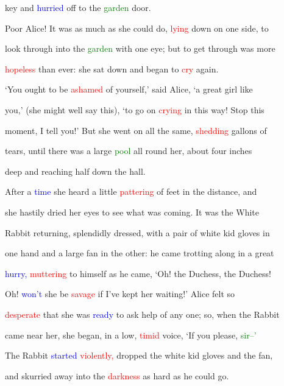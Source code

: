  key and \textcolor{blue}{hurried} off to the \textcolor{green}{garden} door.



 Poor Alice! It was as much as she could do, \textcolor{red}{lying} down on one side, to

 look through into the \textcolor{green}{garden} with one eye; but to get through was more

 \textcolor{red}{hopeless} than ever: she sat down and began to \textcolor{red}{cry} again.



 ‘You ought to be \textcolor{red}{ashamed} of yourself,’ said Alice, ‘a great girl like

 you,’ (she might well say this), ‘to go on \textcolor{red}{crying} in this way! Stop this

 moment, I tell you!’ But she went on all the same, \textcolor{red}{shedding} gallons of

 tears, until there was a large \textcolor{green}{pool} all round her, about four inches

 deep and reaching half down the hall.



 After a \textcolor{blue}{time} she heard a little \textcolor{red}{pattering} of feet in the distance, and

 she hastily dried her eyes to see what was coming. It was the \textcolor{BurntOrange}{White}

 Rabbit returning, splendidly dressed, with a pair of \textcolor{BurntOrange}{white} kid gloves in

 one hand and a large fan in the other: he came trotting along in a great

 \textcolor{blue}{hurry,} \textcolor{red}{muttering} to himself as he came, ‘Oh! the Duchess, the Duchess!

 Oh! \textcolor{blue}{won’t} she be \textcolor{red}{savage} if I’ve kept her \textcolor{BurntOrange}{waiting!’} Alice felt so

 \textcolor{red}{desperate} that she was \textcolor{blue}{ready} to ask help of any one; so, when the Rabbit

 came near her, she began, in a low, \textcolor{red}{timid} voice, ‘If you please, \textcolor{green}{sir--’}

 The Rabbit \textcolor{blue}{started} \textcolor{red}{violently,} dropped the \textcolor{BurntOrange}{white} kid gloves and the fan,

 and skurried away into the \textcolor{red}{darkness} as hard as he could go.



